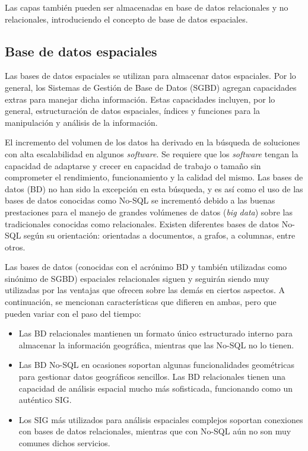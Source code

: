Las capas también pueden ser almacenadas en base de datos relacionales y no relacionales, introduciendo el concepto de base de datos espaciales.


\subsection{Base de datos espaciales}

Las bases de datos espaciales se utilizan para almacenar datos espaciales. Por lo general, los Sistemas de Gestión de Base de Datos (SGBD) agregan capacidades extras para manejar dicha información. Estas capacidades incluyen, por lo general, estructuración de datos espaciales, índices y funciones para la manipulación y análisis de la información.

El incremento del volumen de los datos ha derivado en la búsqueda de soluciones con alta escalabilidad en algunos \textit{software}. Se requiere que los \textit{software} tengan la capacidad de adaptarse y crecer en capacidad de trabajo o tamaño sin comprometer el rendimiento, funcionamiento y la calidad del mismo. Las bases de datos (BD) no han sido la excepción en esta búsqueda, y es así como el uso de las bases de datos conocidas como No-SQL se incrementó debido a las buenas prestaciones para el manejo de grandes volúmenes de datos (\textit{big data}) sobre las tradicionales conocidas como relacionales. Existen diferentes bases de datos No-SQL según su orientación: orientadas a documentos, a grafos, a columnas, entre otros.

Las bases de datos (conocidas con el acrónimo BD y también utilizadas como sinónimo de SGBD) espaciales relacionales siguen y seguirán siendo muy utilizadas por las ventajas que ofrecen sobre las demás en ciertos aspectos. A continuación, se mencionan características que difieren en ambas, pero que pueden variar con el paso del tiempo:

\begin{itemize}
    \item Las BD relacionales mantienen un formato único estructurado interno para almacenar la información geográfica, mientras que las No-SQL no lo tienen.
    \item Las BD No-SQL en ocasiones soportan algunas funcionalidades geométricas para gestionar datos geográficos sencillos. Las BD relacionales tienen una capacidad de análisis espacial mucho más sofisticada, funcionando como un auténtico SIG.
    \item Los SIG más utilizados para análisis espaciales complejos soportan conexiones con bases de datos relacionales, mientras que con No-SQL aún no son muy comunes dichos servicios.
\end{itemize}

